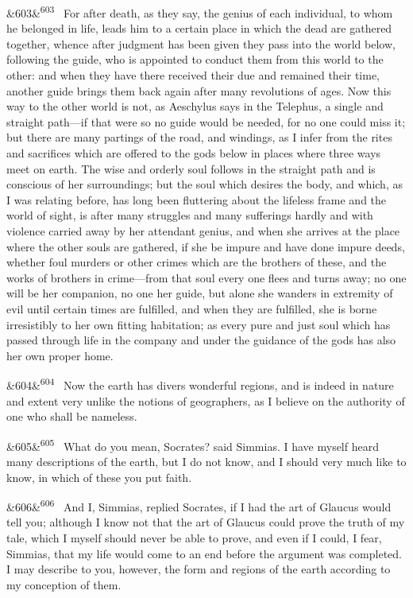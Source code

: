 \documentclass[12pt]{article}
\newcommand{\para}[1][]{\par\noindent\ifx&#1&\else\textsuperscript{\footnotesize #1}~\fi}
\begin{document}
\para[603] For after death, as they say, the genius of each individual, to whom he belonged in life, leads him to a certain place in which the dead are gathered together, whence after judgment has been given they pass into the world below, following the guide, who is appointed to conduct them from this world to the other: and when they have there received their due and remained their time, another guide brings them back again after many revolutions of ages. Now this way to the other world is not, as Aeschylus says in the Telephus, a single and straight path---if that were so no guide would be needed, for no one could miss it; but there are many partings of the road, and windings, as I infer from the rites and sacrifices which are offered to the gods below in places where three ways meet on earth. The wise and orderly soul follows in the straight path and is conscious of her surroundings; but the soul which desires the body, and which, as I was relating before, has long been fluttering about the lifeless frame and the world of sight, is after many struggles and many sufferings hardly and with violence carried away by her attendant genius, and when she arrives at the place where the other souls are gathered, if she be impure and have done impure deeds, whether foul murders or other crimes which are the brothers of these, and the works of brothers in crime---from that soul every one flees and turns away; no one will be her companion, no one her guide, but alone she wanders in extremity of evil until certain times are fulfilled, and when they are fulfilled, she is borne irresistibly to her own fitting habitation; as every pure and just soul which has passed through life in the company and under the guidance of the gods has also her own proper home.

\para[604] Now the earth has divers wonderful regions, and is indeed in nature and extent very unlike the notions of geographers, as I believe on the authority of one who shall be nameless.

\para[605] What do you mean, Socrates? said Simmias. I have myself heard many descriptions of the earth, but I do not know, and I should very much like to know, in which of these you put faith.

\para[606] And I, Simmias, replied Socrates, if I had the art of Glaucus would tell you; although I know not that the art of Glaucus could prove the truth of my tale, which I myself should never be able to prove, and even if I could, I fear, Simmias, that my life would come to an end before the argument was completed. I may describe to you, however, the form and regions of the earth according to my conception of them.
\end{document}
